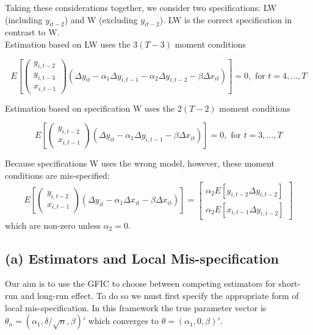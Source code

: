 Taking these considerations together, we consider two specifications: LW (including $y_{it-2}$) and W (excluding $y_{it-2}$). 
 LW is the correct specification in contrast to W. \\
Estimation based on LW uses the $3(T - 3)$ moment conditions

	\begin{equation}
E\left[ \left(\begin{array}{c} y_{i,t-2}\\ y_{i,t-3}\\ x_{i,t-1}
\end{array}\right)\left(\Delta y_{it} - \alpha_1\Delta y_{i,t-1} - \alpha_2 \Delta y_{i,t-2} -\beta \Delta x_{it}\right)\right] = 0, \mbox{ for } t = 4, \hdots, T
\end{equation}


Estimation based on specification W uses the $2(T-2)$ moment conditions

\begin{equation}
E\left[ \left(\begin{array}{c} y_{i,t-2}\\ x_{i,t-1}
\end{array}\right)\left(\Delta y_{it} - \alpha_1\Delta y_{i,t-1}  -\beta \Delta x_{it}\right)\right] = 0, \mbox{ for } t = 3, \hdots, T
\end{equation}

Because specifications W uses the wrong model, however, these moment conditions are mis-specified:
\begin{equation}
\label{eq:trueexpectSRvsLR}
E\left[\left(\begin{array}{c}y_{i,t-2}\\x_{i,t-1}\end{array}\right) \left(\Delta y_{it} - \alpha_1 \Delta x_{it}-\beta \Delta x_{it} \right)\right] = \left[\begin{array}{c}\alpha_2 E[y_{i,t-2}\Delta y_{i,t-2}]\\\alpha_2 E[x_{i,t-1}\Delta y_{i,t-2}] \end{array} \right]
\end{equation}
which are non-zero unless $\alpha_2 = 0$.



\subsection*{(a) Estimators and Local Mis-specification}
\vspace{0.1in}
Our aim is to use the GFIC to choose between competing estimators for short-run and long-run effect. 
To do so we must first specify the appropriate form of local mis-specification. In this framework the true parameter vector is $\theta_n = \left(\alpha_1, \delta/\sqrt{n}, \beta \right)'$ which converges to $\theta = \left(\alpha_1,0,\beta \right)'$. 


